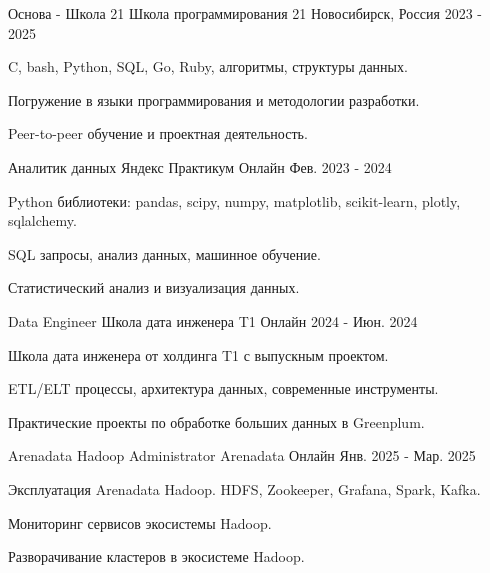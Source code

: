 \begin{cventries}

  \cventry
    {Основа - Школа 21} %
    {Школа программирования 21} %
    {Новосибирск, Россия} %
    {2023 - 2025} %
    {
      \begin{cvitems} %
        \item {C, bash, Python, SQL, Go, Ruby, алгоритмы, структуры данных.}
        \item {Погружение в языки программирования и методологии разработки.}
        \item {Peer-to-peer обучение и проектная деятельность.}
      \end{cvitems}
    }

  \cventry
    {Аналитик данных} %
    {Яндекс Практикум} %
    {Онлайн} %
    {Фев. 2023 - 2024} %
    {
      \begin{cvitems} %
        \item {Python библиотеки: pandas, scipy, numpy, matplotlib, scikit-learn, plotly, sqlalchemy.}
        \item {SQL запросы, анализ данных, машинное обучение.}
        \item {Статистический анализ и визуализация данных.}
      \end{cvitems}
    }

  \cventry
    {Data Engineer} %
    {Школа дата инженера T1} %
    {Онлайн} %
    {2024 - Июн. 2024} %
    {
      \begin{cvitems} %
        \item {Школа дата инженера от холдинга T1 с выпускным проектом.}
        \item {ETL/ELT процессы, архитектура данных, современные инструменты.}
        \item {Практические проекты по обработке больших данных в Greenplum.}
      \end{cvitems}
    }

  \cventry
    {Arenadata Hadoop Administrator} %
    {Arenadata} %
    {Онлайн} %
    {Янв. 2025 - Мар. 2025} %
    {
      \begin{cvitems} %
        \item {Эксплуатация Arenadata Hadoop. HDFS, Zookeeper, Grafana, Spark, Kafka.}
        \item {Мониторинг сервисов экосистемы Hadoop.}
        \item {Разворачивание кластеров в экосистеме Hadoop.}
      \end{cvitems}
    }


\end{cventries}
